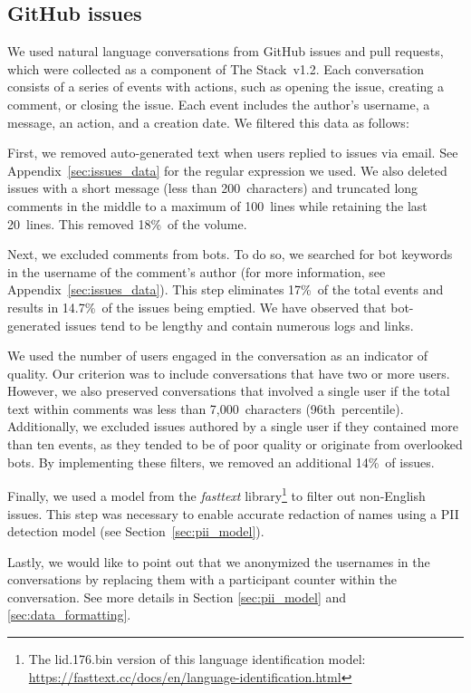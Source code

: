 \documentclass[10pt]{article} %
\begin{document}
\subsection{GitHub issues}
We used natural language conversations from GitHub issues and pull requests, which were collected as a component of The Stack~v1.2. Each conversation consists of a series of events with actions, such as opening the issue, creating a comment, or closing the issue. Each event includes the author’s username, a message, an action, and a creation date. We filtered this data as follows:
\begin{inparaenum}[1)]
\item First, we removed auto-generated text when users replied to issues via email. See Appendix~\ref{sec:issues_data} for the regular expression we used. We also deleted issues with a short message (less than 200~characters) and truncated long comments in the middle to a maximum of 100~lines while retaining the last 20~lines. This removed 18\%~of the volume.
\item Next, we excluded comments from bots. To do so,  we searched for bot keywords in the username of the comment's author (for more information, see Appendix~\ref{sec:issues_data}). This step eliminates 17\%~of the total events and results in 14.7\%~of the issues being emptied. We have observed that bot-generated issues tend to be lengthy and contain numerous logs and links.
\item We used the number of users engaged in the conversation as an indicator of quality. Our criterion was to include conversations that have two or more users. However, we also preserved conversations that involved a single user if the total text within comments was less than 7,000~characters (96th~percentile). Additionally, we excluded issues authored by a single user if they contained more than ten events, as they tended to be of poor quality or originate from overlooked bots. By implementing these filters, we removed an additional 14\%~of issues. 
\item Finally, we used a model from the \textit{fasttext} library\footnote{The lid.176.bin version of this language identification model: \url{https://fasttext.cc/docs/en/language-identification.html}} to filter out non-English issues. This step was necessary to enable accurate redaction of names using a PII detection model (see Section~\ref{sec:pii_model}). 

Lastly, we would like to point out that we anonymized the usernames in the conversations by replacing them with a participant counter within the conversation. See more details in Section \ref{sec:pii_model} and \ref{sec:data_formatting}. 
\end{inparaenum}
\end{document}
